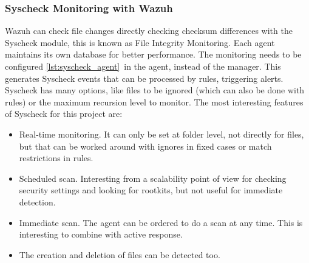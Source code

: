 \subsubsection{Syscheck Monitoring with Wazuh}
Wazuh can check file changes directly checking checksum differences with the Syscheck module, this is known as File Integrity Monitoring.
Each agent maintains its own database for better performance.
\linej
The monitoring needs to be configured \ref{lst:syscheck_agent}\ in the agent, instead of the manager.
This generates Syscheck events that can be processed by rules, triggering alerts.
Syscheck has many options, like files to be ignored (which can also be done with rules) or the maximum recursion level to monitor.
\linej
The most interesting features of Syscheck for this project are\cite{libro_ossec}:
\begin{itemize}
	\item Real-time monitoring. It can only be set at folder level, not directly for files, but that can be worked around with ignores in fixed cases or match restrictions in rules.
	\item Scheduled scan. Interesting from a scalability point of view for checking security settings and looking for rootkits, but not useful for immediate detection.
	\item Immediate scan. The agent can be ordered to do a scan at any time. This is interesting to combine with active response.
	\item The creation and deletion of files can be detected too.
\end{itemize}

